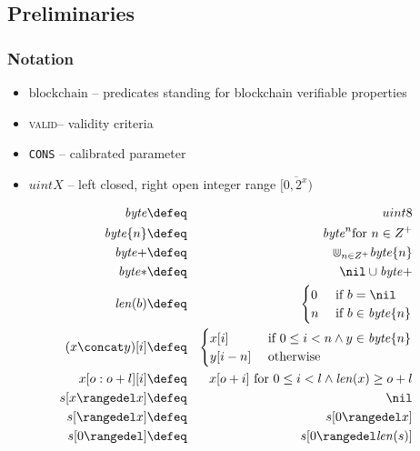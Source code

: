 
\subsection{Preliminaries}
\subsubsection{Notation}

\begin{itemize}[noitemsep]
    \item  $\mathrm{blockchain}$ -- predicates standing for blockchain verifiable properties 
    \item \textsc{valid}-- validity criteria
    \item \texttt{CONS} -- calibrated parameter
    \item $\mathit{uintX}$ -- left closed, right open integer range $\overline{[0,2^x)}$
\end{itemize}

\begin{definition}

\begin{eqnarray}
\mathit{byte} &\defeq& uint8\\
\mathit{byte}\{n\} &\defeq& \mathit{byte}^n \text{for }n\in Z^{+}\\
\mathit{byte}{+}&\defeq&\Cup_{n\in Z^{+}} \mathit{byte}\{n\}\\
\mathit{byte}{*}&\defeq&\nil\cup\mathit{byte}{+}\\
\mathit{len}(b)&\defeq& \begin{cases}
0 & \text{ if  } b=\nil\\
n & \text{ if  } b\in\mathit{byte}\{n\}
\end{cases}\\
(x\concat y)[i] &\defeq& \begin{cases}x[i] & \text{ if  } 0\leq i<n
\wedge  y\in\mathit{byte}\{n\}\\
y[i-n] &\text{ otherwise}\end{cases}\\
x[o:o+l][i]&\defeq&x[o+i] \text{ for  } 0\leq i<l
\land  \mathit{len}(x)\geq o+l\\
s[x\rangedel x] &\defeq& \nil\\%
s[\rangedel x] &\defeq& s[0\rangedel x] \\                      
s[0\rangedel] &\defeq& s[0\rangedel \mathit{len}(s)]
\end{eqnarray}
\end{definition}

